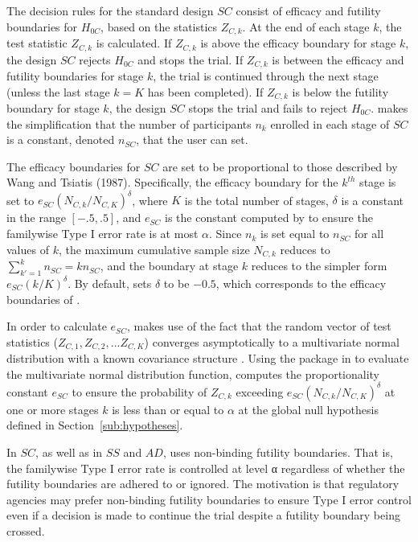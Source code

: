 \documentclass[article]{jss}
\begin{document}
The decision rules for the standard design $SC$ consist of efficacy and futility boundaries for $H_{0C}$, based on the statistics $Z_{C,k}$. At the end of each stage $k$,  the test statistic $Z_{C,k}$ is calculated. If $Z_{C,k}$ is above the efficacy boundary for stage $k$, the design $SC$ rejects $H_{0C}$ and stops the trial. If $Z_{C,k}$ is between the efficacy and futility boundaries for stage $k$, the trial is continued through the next stage (unless the last stage $k=K$ has been completed). If $Z_{C,k}$ is below the futility boundary for stage $k$, the design $SC$ stops the trial and fails to reject $H_{0C}$.  makes the simplification that the number of participants $n_k$ enrolled in each stage of $SC$ is a constant, denoted  $n_{SC}$, that the user can set.

The efficacy boundaries for $SC$ are set to be proportional to those described by Wang and Tsiatis (1987). Specifically, the efficacy boundary for the $k^{th}$ stage is set to $e_{SC}(N_{C,k}/N_{C,K})^{\delta}$, where $K$ is the total number of stages, $δ$ is a constant in the range $[-.5,.5]$, and $e_{SC}$ is the constant computed by    to ensure the familywise Type I error rate is at most $\alpha$. Since $n_{k}$ is set equal to $n_{SC}$ for all values of $k$, the maximum cumulative sample size $N_{C,k}$ reduces to $\sum_{k'=1}^k n_{SC}=k n_{SC}$, and the boundary at stage $k$ reduces to the simpler form $e_{SC}(k/K)^\delta$. By default,  sets $\delta$ to be $-0.5$, which corresponds to the efficacy boundaries of \cite{obrienfleming}. %

In order to calculate $e_{SC}$,  makes use of the fact that the random vector of test statistics ($Z_{C,1},Z_{C,2},…Z_{C,K}$) converges asymptotically to a multivariate normal distribution with a known covariance structure \citep{JennisonTurnbullBook}. %
Using the  package \citep{mvtnorm} in  to evaluate the multivariate normal distribution function,  computes the proportionality constant $e_{SC}$ to ensure the probability of $Z_{C,k}$ exceeding $e_{SC}(N_{C,k}/N_{C,K})^{\delta}$ at one or more stages $k$ is less than or equal to $α$ at the global null hypothesis defined in Section~\ref{sub:hypotheses}.

In $SC$, as well as in $SS$ and $AD$,  uses non-binding futility boundaries. That is, the familywise Type I error rate is controlled at level α regardless of whether the futility boundaries are adhered to or ignored. The motivation  is that regulatory agencies may prefer non-binding futility boundaries to ensure Type I error control even if a decision is made to continue the trial despite a futility boundary being crossed.
\end{document}
